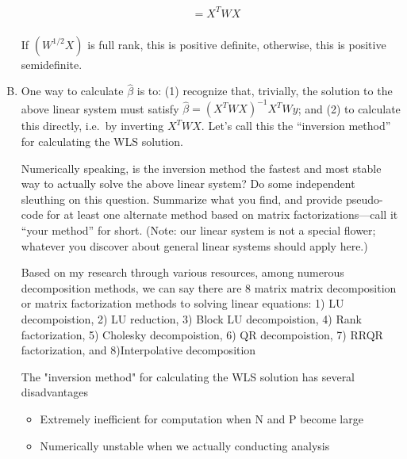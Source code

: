 \documentclass{article}
\begin{document}
\begin{enumerate}[(A)]
\begin{align*}
		& = X^T W X  \\

\end{align*}

If $( W^{1/2} X)$ is full rank, this is positive definite, otherwise, this is positive semidefinite. 



\color{black}

\item One way to calculate $\hat{\beta}$ is to: (1) recognize that, trivially, the solution to the above linear system must satisfy $\hat \beta = (X^T W X)^{-1} X^T W y$; and (2) to calculate this directly, i.e.~by inverting $X^T W X$.  Let's call this the ``inversion method'' for calculating the WLS solution.

	

	Numerically speaking, is the inversion method the fastest and most stable way to actually solve the above linear system?  Do some independent sleuthing on this question.  Summarize what you find, and provide pseudo-code for at least one alternate method based on matrix factorizations---call it ``your method'' for short.  (Note: our linear system is not a special flower; whatever you discover about general linear systems should apply here.)



\color{blue}

Based on my research through various resources, among numerous decomposition methods, we can say there are 8 matrix matrix decomposition or matrix factorization methods to solving linear equations: 1) LU decompoistion, 2) LU reduction, 3) Block LU decompoistion, 4) Rank factorization, 5) Cholesky decompoistion, 6) QR decompoistion, 7) RRQR factorization, and 8)Interpolative decomposition 





The "inversion method" for calculating the WLS solution has several disadvantages

\begin{itemize}

	\item Extremely inefficient for computation when N and P become large 

	\item Numerically unstable when we actually conducting analysis

\end{itemize}








\end{enumerate}
\end{document}
